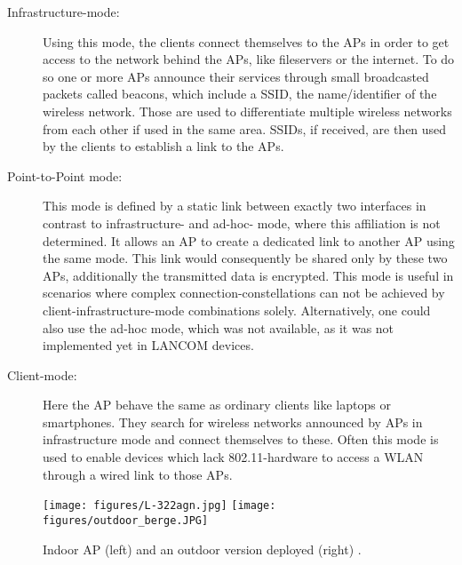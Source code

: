     \begin{description}
      \item[Infrastructure-mode:]
	Using this mode, the clients connect themselves to the APs in order to get access to the network behind the APs, like fileservers or the internet.
	To do so one or more APs announce their services through small broadcasted packets called beacons, which include a \ac{SSID}, 
	the name/identifier of the wireless network. Those are used to differentiate multiple wireless networks from each other if used in the same area. 
	SSIDs, if received, are then used by the clients to establish a link to the APs.

      \item [Point-to-Point mode:]
	This mode is defined by a static link between exactly two interfaces in contrast to infrastructure- and ad-hoc- mode, where this affiliation is not determined.
	It allows an \ac{AP} to create a dedicated link to another \ac{AP} using the same mode. This link would consequently be shared only by these two APs,
	additionally the transmitted data is encrypted. This mode is useful in scenarios where complex connection-constellations can not be achieved by 
	client-infrastructure-mode combinations solely. Alternatively, one could also use the ad-hoc mode, which was not available, as it was not implemented yet in LANCOM devices.
	
      \item [Client-mode:]
	Here the \ac{AP} behave the same as ordinary clients like laptops or smartphones.
	They search for wireless networks announced by APs in infrastructure mode and connect themselves to these.
	Often this mode is used to enable devices which lack 802.11-hardware to access a \ac{WLAN} through a wired link to those APs.
    \end{description}
    
    \begin{figure}[bh!]
      \centerline{
	\texttt{[image: figures/L-322agn.jpg]}
	\texttt{[image: figures/outdoor\_berge.JPG]}
      }
      \caption{Indoor \ac{AP} (left) and an outdoor version deployed (right) \cite{lancom}.}
      \label{fig:L-322agn}
    \end{figure}
    
    \newpage
     
